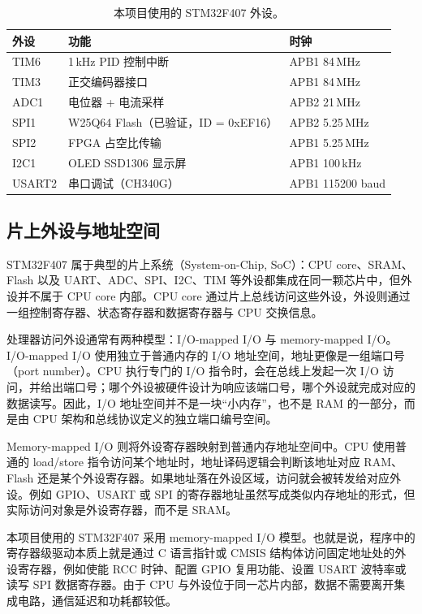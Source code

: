\documentclass[12pt, a4paper]{ctexrep}
\begin{document}
\begin{table}[H]
    \centering
    \caption{本项目使用的 STM32F407 外设。}
    \label{tab:mcu_periph}
    \begin{tabular}{lll}
        \toprule
        \textbf{外设} & \textbf{功能} & \textbf{时钟} \\
        \midrule
        TIM6   & 1\,kHz PID 控制中断 & APB1 84\,MHz \\
        TIM3   & 正交编码器接口       & APB1 84\,MHz \\
        ADC1   & 电位器 + 电流采样    & APB2 21\,MHz \\
        SPI1   & W25Q64 Flash（已验证，ID = 0xEF16）& APB2 5.25\,MHz \\
        SPI2   & FPGA 占空比传输      & APB1 5.25\,MHz \\
        I2C1   & OLED SSD1306 显示屏  & APB1 100\,kHz \\
        USART2 & 串口调试（CH340G）   & APB1 115200 baud \\
        \bottomrule
    \end{tabular}
\end{table}

\subsection{片上外设与地址空间}

STM32F407 属于典型的片上系统（System-on-Chip, SoC）：CPU core、SRAM、Flash 以及 UART、ADC、SPI、I2C、TIM 等外设都集成在同一颗芯片中，但外设并不属于 CPU core 内部。CPU core 通过片上总线访问这些外设，外设则通过一组控制寄存器、状态寄存器和数据寄存器与 CPU 交换信息。

处理器访问外设通常有两种模型：I/O-mapped I/O 与 memory-mapped I/O。I/O-mapped I/O 使用独立于普通内存的 I/O 地址空间，地址更像是一组端口号（port number）。CPU 执行专门的 I/O 指令时，会在总线上发起一次 I/O 访问，并给出端口号；哪个外设被硬件设计为响应该端口号，哪个外设就完成对应的数据读写。因此，I/O 地址空间并不是一块“小内存”，也不是 RAM 的一部分，而是由 CPU 架构和总线协议定义的独立端口编号空间。

Memory-mapped I/O 则将外设寄存器映射到普通内存地址空间中。CPU 使用普通的 load/store 指令访问某个地址时，地址译码逻辑会判断该地址对应 RAM、Flash 还是某个外设寄存器。如果地址落在外设区域，访问就会被转发给对应外设。例如 GPIO、USART 或 SPI 的寄存器地址虽然写成类似内存地址的形式，但实际访问对象是外设寄存器，而不是 SRAM。

本项目使用的 STM32F407 采用 memory-mapped I/O 模型。也就是说，程序中的寄存器级驱动本质上就是通过 C 语言指针或 CMSIS 结构体访问固定地址处的外设寄存器，例如使能 RCC 时钟、配置 GPIO 复用功能、设置 USART 波特率或读写 SPI 数据寄存器。由于 CPU 与外设位于同一芯片内部，数据不需要离开集成电路，通信延迟和功耗都较低。
\end{document}
